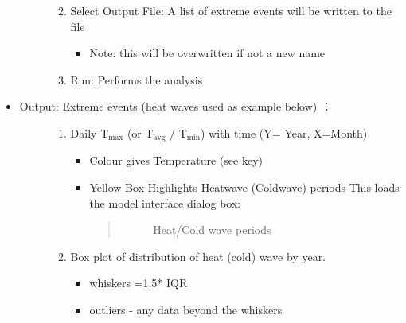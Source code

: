 \documentclass[letterpaper,10pt,english]{sphinxmanual}
\begin{document}
\begin{itemize}
\begin{description}
\begin{enumerate}
\begin{itemize}
\begin{itemize}
\end{itemize}

\end{itemize}

\item {} 
Select Output File: A list of extreme events will be written to the file
\begin{itemize}
\item {} 
Note: this will be overwritten if not a new name

\end{itemize}

\item {} 
Run: Performs the analysis

\end{enumerate}

\end{description}

\item {} \begin{description}
\item[{Output: Extreme events (heat waves used as example below) ：}] \leavevmode\begin{enumerate}
\item {} 
Daily T$_{\text{max}}$ (or T$_{\text{avg}}$ / T$_{\text{min}}$) with time (Y= Year, X=Month)
\begin{itemize}
\item {} 
Colour gives Temperature (see key)

\item {} 
Yellow Box Highlights Heatwave (Coldwave) periods This loads the model interface dialog box:
\begin{quote}

\begin{figure}[htbp]
\centering
\capstart

\noindent{}
\caption{Heat/Cold wave periods}\label{\detokenize{processor/Outdoor Thermal Comfort ExtremeFinder:id2}}\end{figure}
\end{quote}

\end{itemize}

\item {} 
Box plot of distribution of heat (cold) wave by year.
\begin{itemize}
\item {} 
whiskers =1.5* IQR

\item {} 
outliers
- any data beyond the whiskers
\begin{quote}


\end{quote}
\end{itemize}
\end{enumerate}
\end{description}
\end{itemize}
\end{document}

